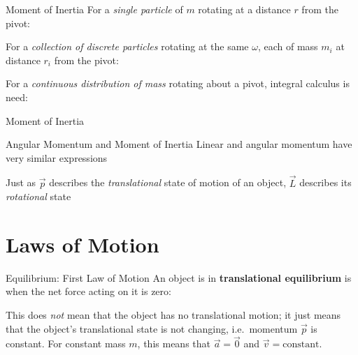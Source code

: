 \documentclass[12pt,compress,aspectratio=169]{beamer}
\begin{document}
\begin{frame}{Moment of Inertia}
  For a \emph{single particle} of $m$ rotating at a distance $r$ from the pivot:
  

  \vspace{-.1in}For a \emph{collection of discrete particles} rotating at the
  same $\omega$, each of mass $m_i$ at distance $r_i$ from the pivot:


  For a \emph{continuous distribution of mass} rotating about a pivot, integral
  calculus is need:

\end{frame}



\begin{frame}{Moment of Inertia}
  \centering
\end{frame}



\begin{frame}{Angular Momentum and Moment of Inertia}
  Linear and angular momentum have very similar expressions
    
  \vspace{-.3in}{\large
    \begin{align*}
      \vec p &= m\vec v\\
      \vec L &= I\vec\omega
    \end{align*}
  }
  
  Just as $\vec p$ describes the \emph{translational} state of motion of an
  object, $\vec L$ describes its \emph{rotational} state
\end{frame}



\section{Laws of Motion}

\begin{frame}{Equilibrium: First Law of Motion}
  An object is in \textbf{translational equilibrium} is when the net force
  acting on it is zero:
  

  This does \emph{not} mean that the object has no translational motion; it
  just means that the object's translational state is not changing, i.e.\
  momentum $\vec p$ is constant. For constant mass $m$, this means that
  $\vec a=\vec 0$ and $\vec v=\text{constant}$.
\end{frame}
\end{document}
